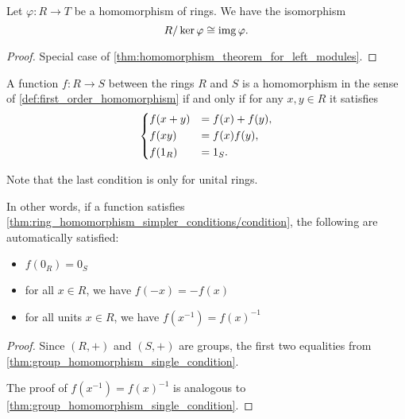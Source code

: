\begin{theorem}\label{thm:homomorphism_theorem_for_rings}
  Let \( \varphi: R \to T \) be a homomorphism of rings. We have the isomorphism
  \begin{equation*}
    R / \ker \varphi \cong \operatorname{img} \varphi.
  \end{equation*}
\end{theorem}
\begin{proof}
  Special case of \cref{thm:homomorphism_theorem_for_left_modules}.
\end{proof}

\begin{proposition}\label{thm:ring_homomorphism_simpler_conditions}
  A function \( f: R \to S \) between the rings \( R \) and \( S \) is a homomorphism in the sense of \cref{def:first_order_homomorphism} if and only if for any \( x, y \in R \) it satisfies
  \begin{equation}\label{thm:ring_homomorphism_simpler_conditions/condition}
    \begin{dcases}
      f(x + y) &= f(x) + f(y), \\
      f(xy) &= f(x) f(y), \\
      f(1_R) &= 1_S.
    \end{dcases}
  \end{equation}

  Note that the last condition is only for unital rings.

  In other words, if a function satisfies \cref{thm:ring_homomorphism_simpler_conditions/condition}, the following are automatically satisfied:
  \begin{itemize}
    \item \( f(0_R) = 0_S \)
    \item for all \( x \in R \), we have \( f(-x) = -f(x) \)
    \item for all units \( x \in R \), we have \( f(x^{-1}) = f(x)^{-1} \)
  \end{itemize}
\end{proposition}
\begin{proof}
  Since \( (R, +) \) and \( (S, +) \) are groups, the first two equalities from \cref{thm:group_homomorphism_single_condition}.

  The proof of \( f(x^{-1}) = f(x)^{-1} \) is analogous to \cref{thm:group_homomorphism_single_condition}.
\end{proof}

